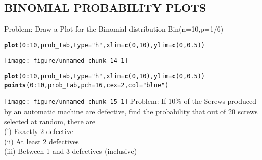 \documentclass{article}\usepackage[]{graphicx}\usepackage[]{xcolor}
\makeatletter
\def\maxwidth{ %
  \ifdim\Gin@nat@width>\linewidth
    \linewidth
  \else
    \Gin@nat@width
  \fi
}
\newcommand{\hlnum}[1]{\textcolor[rgb]{0.686,0.059,0.569}{#1}}%
\newcommand{\hlsng}[1]{\textcolor[rgb]{0.192,0.494,0.8}{#1}}%
\newcommand{\hlopt}[1]{\textcolor[rgb]{0,0,0}{#1}}%
\newcommand{\hldef}[1]{\textcolor[rgb]{0.345,0.345,0.345}{#1}}%
\newcommand{\hlkwc}[1]{\textcolor[rgb]{0.333,0.667,0.333}{#1}}%
\newcommand{\hlkwd}[1]{\textcolor[rgb]{0.737,0.353,0.396}{\textbf{#1}}}%
\newenvironment{kframe}{%
 \def\at@end@of@kframe{}%
 \ifinner\ifhmode%
  \def\at@end@of@kframe{\end{minipage}}%
  \begin{minipage}{\columnwidth}%
 \fi\fi%
 \def\FrameCommand##1{\hskip\@totalleftmargin \hskip-\fboxsep
 \colorbox{shadecolor}{##1}\hskip-\fboxsep
     \hskip-\linewidth \hskip-\@totalleftmargin \hskip\columnwidth}%
 \MakeFramed {\advance\hsize-\width
   \@totalleftmargin\z@ \linewidth\hsize
   \@setminipage}}%
 {\par\unskip\endMakeFramed%
 \at@end@of@kframe}
\newenvironment{knitrout}{}{} %
\makeatother
\begin{document}
\subsection{BINOMIAL PROBABILITY PLOTS}
Problem: \newline
Draw a Plot for the Binomial distribution Bin(n=10,p=1/6)
\begin{knitrout}
\color{fgcolor}\begin{kframe}
\begin{alltt}
\hlkwd{plot}\hldef{(}\hlnum{0}\hlopt{:}\hlnum{10}\hldef{,prob_tab,}\hlkwc{type}\hldef{=}\hlsng{"h"}\hldef{,}\hlkwc{xlim}\hldef{=}\hlkwd{c}\hldef{(}\hlnum{0}\hldef{,}\hlnum{10}\hldef{),}\hlkwc{ylim}\hldef{=}\hlkwd{c}\hldef{(}\hlnum{0}\hldef{,}\hlnum{0.5}\hldef{))}
\end{alltt}
\end{kframe}
\texttt{[image: figure/unnamed-chunk-14-1]} 
\end{knitrout}
\begin{knitrout}
\color{fgcolor}\begin{kframe}
\begin{alltt}
\hlkwd{plot}\hldef{(}\hlnum{0}\hlopt{:}\hlnum{10}\hldef{,prob_tab,}\hlkwc{type}\hldef{=}\hlsng{"h"}\hldef{,}\hlkwc{xlim}\hldef{=}\hlkwd{c}\hldef{(}\hlnum{0}\hldef{,}\hlnum{10}\hldef{),}\hlkwc{ylim}\hldef{=}\hlkwd{c}\hldef{(}\hlnum{0}\hldef{,}\hlnum{0.5}\hldef{))}
\hlkwd{points}\hldef{(}\hlnum{0}\hlopt{:}\hlnum{10}\hldef{,prob_tab,}\hlkwc{pch}\hldef{=}\hlnum{16}\hldef{,}\hlkwc{cex}\hldef{=}\hlnum{2}\hldef{,} \hlkwc{col}\hldef{=}\hlsng{"blue"}\hldef{)}
\end{alltt}
\end{kframe}
\texttt{[image: figure/unnamed-chunk-15-1]} 
\end{knitrout}
Problem: \newline
If 10\% of the Screws produced by an automatic machine are defective, find the
probability that out of 20 screws selected at random, there are\\
(i) Exactly 2 defective\\
(ii) At least 2 defectives\\
(iii) Between 1 and 3 defectives (inclusive)\\
\end{document}
